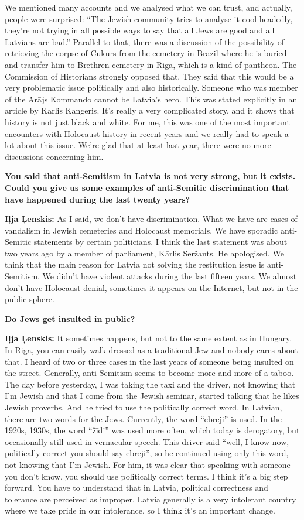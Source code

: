 We mentioned many accounts and we analysed what we can trust, and actually, people were surprised: ``The Jewish community tries to analyse it cool-headedly, they're not trying in all possible ways to say that all Jews are good and all Latvians are bad.'' Parallel to that, there was a discussion of the possibility of retrieving the corpse of Cukurs from the cemetery in Brazil where he is buried and transfer him to Brethren cemetery in Riga, which is a kind of pantheon. The Commission of Historians strongly opposed that. They said that this would be a very problematic issue politically and also historically. Someone who was member of the Arājs Kommando cannot be Latvia's hero. This was stated explicitly in an article by Karlis Kangeris. It's really a very complicated story, and it shows that history is not just black and white. For me, this was one of the most important encounters with Holocaust history in recent years and we really had to speak a lot about this issue. We’re glad that at least last year, there were no more discussions concerning him. 

\sloppy
\textbf{You said that anti-Semitism in Latvia is not very strong, but it exists. Could you give us some examples of anti-Semitic discrimination that have happened during the last twenty years?} 

\textbf{Iļja Ļenskis:} As I said, we don’t have discrimination. What we have are cases of vandalism in Jewish cemeteries and Holocaust memorials. We have sporadic anti-Semitic statements by certain politicians. I think the last statement was about two years ago by a member of parliament, Kārlis Seržants. He apologised. We think that the main reason for Latvia not solving the restitution issue is anti-Semitism. We didn't have violent attacks during the last fifteen years. We almost don’t have Holocaust denial, sometimes it appears on the Internet, but not in the public sphere.

\textbf{Do Jews get insulted in public?} 

\textbf{Iļja Ļenskis:} It sometimes happens, but not to the same extent as in Hungary. In Riga, you can easily walk dressed as a traditional Jew and nobody cares about that. I heard of two or three cases in the last years of someone being insulted on the street. Generally, anti-Semitism seems to become more and more of a taboo. The day before yesterday, I was taking the taxi and the driver, not knowing that I’m Jewish and that I come from the Jewish seminar, started talking that he likes Jewish proverbs. And he tried to use the politically correct word. In Latvian, there are two words for the Jews. Currently, the word ``ebreji'' is used. In the 1920s, 1930s, the word ``žīdi'' was used more often, which today is derogatory, but occasionally still used in vernacular speech. This driver said ``well, I know now, politically correct you should say ebreji'', so he continued using only this word, not knowing that I’m Jewish. For him, it was clear that speaking with someone you don’t know, you should use politically correct terms. I think it’s a big step forward. You have to understand that in Latvia, political correctness and tolerance are perceived as improper. Latvia generally is a very intolerant country where we take pride in our intolerance, so I think it’s an important change. 

